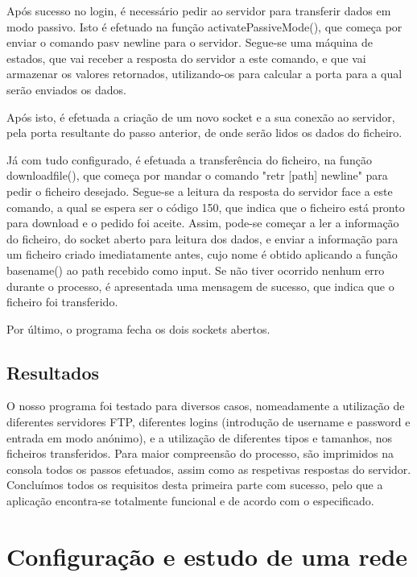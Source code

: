 \documentclass[article, a4paper, 11pt, oneside]{memoir}
\begin{document}
Após sucesso no login, é necessário pedir ao servidor para transferir dados em modo passivo. Isto é efetuado na função activatePassiveMode(), que começa por enviar o comando 
pasv newline para o servidor.
Segue-se uma máquina de estados, que vai receber a resposta do servidor a este comando, e que vai armazenar os valores retornados, 
utilizando-os para calcular a porta para a qual serão enviados os dados. 

Após isto, é efetuada a criação de um novo socket e a sua conexão ao servidor, 
pela porta resultante do passo anterior, de onde serão lidos os dados do ficheiro.

Já com tudo configurado, é efetuada a transferência do ficheiro, na função download\textunderscore file(), que começa por mandar
o comando "retr [path] newline" para pedir o ficheiro desejado. Segue-se a leitura da resposta do servidor face a este comando,
a qual se espera ser o código 150, que indica que o ficheiro está pronto para download e o pedido foi aceite. 
Assim, pode-se começar a ler a informação do ficheiro, do socket aberto para leitura dos dados, e enviar a informação para um ficheiro criado imediatamente antes,
cujo nome é obtido aplicando a função basename() ao path recebido como input. Se não tiver ocorrido nenhum erro durante o processo, é apresentada uma mensagem de sucesso,
que indica que o ficheiro foi transferido. 

Por último, o programa fecha os dois sockets abertos.

\section{Resultados}

O nosso programa foi testado para diversos casos, nomeadamente a utilização de diferentes servidores FTP,
diferentes logins (introdução de username e password e entrada em modo anónimo), e a utilização de diferentes tipos e tamanhos, nos ficheiros transferidos.
Para maior compreensão do processo, são imprimidos na consola todos os passos efetuados, assim como as respetivas respostas do servidor.
Concluímos todos os requisitos desta primeira parte com sucesso, pelo que a aplicação encontra-se totalmente funcional e de acordo com o especificado.

\chapter[Configuração e estudo de uma rede][Configuração e estudo de uma rede]{Configuração e estudo de uma rede} \label{\thechapter}
\end{document}

